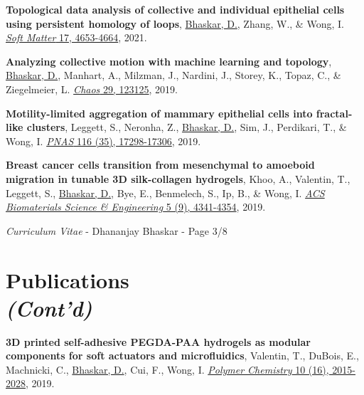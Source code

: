 \documentclass[margin,line]{res}
\begin{document}
\begin{resume}
{\begin{etaremune}[start=20]
\item{\bf Topological data analysis of collective and individual epithelial cells using persistent homology of loops}, 
\underline{Bhaskar, D.}, Zhang, W., \& Wong, I. 
\href{https://doi.org/10.1039/D1SM00072A}{\textit{Soft Matter} 17, 4653-4664}, 2021.
\vspace*{.1cm}

\item{\bf Analyzing collective motion with machine learning and topology}, 
\underline{Bhaskar, D.}, Manhart, A., Milzman, J., Nardini, J., Storey, K., Topaz, C., \& Ziegelmeier, L. 
\href{https://aip.scitation.org/doi/10.1063/1.5125493}{\textit{Chaos} 29, 123125}, 2019.
\vspace*{.1cm}

\item{\bf Motility-limited aggregation of mammary epithelial cells into fractal-like clusters}, 
Leggett, S., Neronha, Z., \underline{Bhaskar, D.}, Sim, J., Perdikari, T., \& Wong, I. 
\href{https://www.pnas.org/content/116/35/17298.short}{\textit{PNAS} 116 (35), 17298-17306}, 2019.

\item{\bf Breast cancer cells transition from mesenchymal to amoeboid migration in tunable 3D silk-collagen hydrogels},
Khoo, A., Valentin, T., Leggett, S., \underline{Bhaskar, D.}, Bye, E., Benmelech, S., Ip, B., \& Wong, I. 
\href{https://pubs.acs.org/doi/abs/10.1021/acsbiomaterials.9b00519}{\textit{ACS Biomaterials Science \& Engineering} 5 (9), 4341-4354}, 2019.
\vspace*{.1cm}

\end{etaremune}
}

\newpage
\begin{flushright}
\textit{Curriculum Vitae} - Dhananjay Bhaskar - Page 3/8
\end{flushright}
\vspace*{.15cm}

\section{\sc Publications\\\textit{(Cont'd)}}
{
\renewcommand\leftmargini{0em}
\begin{etaremune}[start=3]
\item{\bf 3D printed self-adhesive PEGDA-PAA hydrogels as modular components for soft actuators and microfluidics}, 
Valentin, T., DuBois, E., Machnicki, C., \underline{Bhaskar, D.}, Cui, F., Wong, I. 
\href{https://pubs.rsc.org/ko/content/articlehtml/2019/py/c9py00211a}{\textit{Polymer Chemistry} 10 (16), 2015-2028}, 2019.
\vspace*{.1cm}


\end{etaremune}}
\end{resume}
\end{document}
